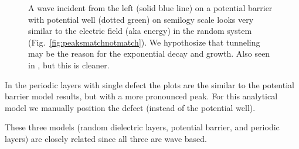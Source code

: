 \begin{figure}
\vskip -0.5cm
\centerline{
}
\vskip -0.5cm
\caption[A wave incident from the left (solid blue line) on a potential barrier with potential well (dotted green) on semilogy scale looks  very similar to the electric field (aka energy) in the random system (Fig.~\ref{fig:peaksmatchnotmatch}).]{A wave incident from the left (solid blue line) on a potential barrier with potential well (dotted green) on semilogy scale looks  very similar to the electric field (aka energy) in the random system (Fig.~\ref{fig:peaksmatchnotmatch}).
We hypothosize that tunneling may be the reason for the
exponential decay and growth. Also seen in 
\cite{2004_Bliokh_wavelet}, but this is cleaner.}
\label{fig:barrierdefectlog}
\end{figure}

In the periodic layers with single defect the plots are the similar to the potential barrier model results, but with a more pronounced peak. For this analytical model we manually position the defect (instead of the potential well).

These three models (random dielectric layers, potential barrier, and periodic layers) are closely related since all three are wave based.

